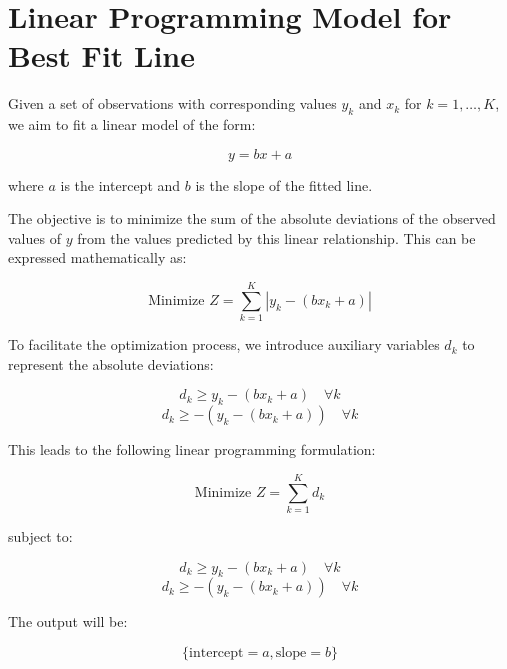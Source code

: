 \documentclass{article}
\begin{document}
\section*{Linear Programming Model for Best Fit Line}

Given a set of observations with corresponding values \( y_k \) and \( x_k \) for \( k = 1, \ldots, K \), we aim to fit a linear model of the form:

\[
y = bx + a
\]

where \( a \) is the intercept and \( b \) is the slope of the fitted line. 

The objective is to minimize the sum of the absolute deviations of the observed values of \( y \) from the values predicted by this linear relationship. This can be expressed mathematically as:

\[
\text{Minimize } Z = \sum_{k=1}^{K} |y_k - (bx_k + a)|
\]

To facilitate the optimization process, we introduce auxiliary variables \( d_k \) to represent the absolute deviations:

\[
d_k \geq y_k - (bx_k + a) \quad \forall k
\]
\[
d_k \geq -(y_k - (bx_k + a)) \quad \forall k
\]

This leads to the following linear programming formulation:

\[
\text{Minimize } Z = \sum_{k=1}^{K} d_k
\]

subject to:

\[
d_k \geq y_k - (bx_k + a) \quad \forall k
\]
\[
d_k \geq -(y_k - (bx_k + a)) \quad \forall k
\]

The output will be:

\[
\{ \text{intercept} = a, \text{slope} = b \}
\]
\end{document}
